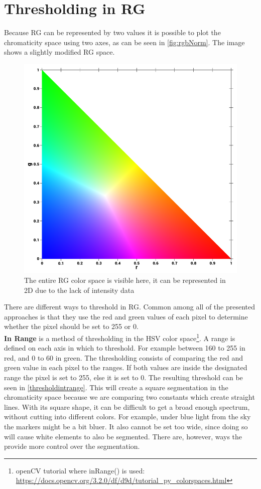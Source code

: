 {\section{Thresholding in RG}
Because RG can be represented by two values it is possible to plot the  chromaticity space using two axes, as can be seen in \autoref{fig:rgbNorm}. The image shows a slightly modified RG space. 
\begin{figure}[H]
	\centering
	\includegraphics[width=0.5\linewidth]{figure/Analysis/normRGB.png}
	\caption{The entire RG color space is visible here, it can be represented in 2D due to the lack of intensity data\protect\footnotemark}
	\label{fig:rgbNorm}
\end{figure}
There are different ways to threshold in RG. Common among all of the presented approaches is that they use the red and green values of each pixel to determine whether the pixel should be set to 255
or 0.\\

\textbf{In Range} is a method of thresholding in the HSV color space\footnote{openCV tutorial where inRange() is used: \url{https://docs.opencv.org/3.2.0/df/d9d/tutorial\_py\_colorspaces.html}}. A range is defined on each axis in which to threshold. For example between 160 to 255 in red, and 0 to 60 in green. The thresholding consists of comparing the red and green value in each pixel to the ranges. If both values are inside the designated range the pixel is set to 255, else it is set to 0. The resulting threshold can be seen in \autoref{thresholdintrange}. This will create a square segmentation in the chromaticity space because we are comparing two constants which create straight lines. With its square shape, it can be difficult to get a broad enough spectrum, without cutting into different colors. For example, under blue light from the sky the markers might be a bit bluer. It also cannot be set too wide, since doing so will cause white elements to also be segmented. There are, however, ways the provide more control over the segmentation.\\

}
